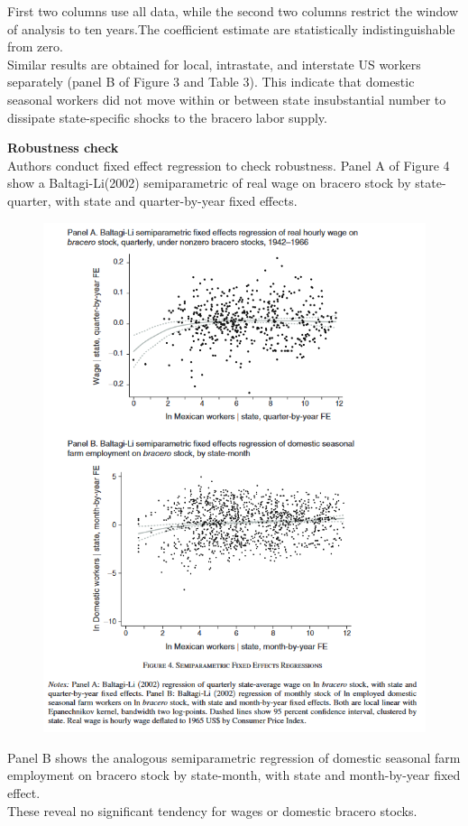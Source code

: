 \documentclass[../root]{subfiles}
\begin{document}
    First two columns use all data, while the second two columns restrict the window of analysis to ten years.The coefficient estimate are statistically indistinguishable from zero.  \\
    Similar results are obtained for local, intrastate, and interstate US workers separately (panel B of Figure 3 and Table 3). This indicate that domestic seasonal workers did not move within or between state insubstantial number to dissipate state-specific shocks to the bracero labor supply. 
    
    {\bf Robustness check} \\
    Authors conduct fixed effect regression to check robustness. Panel A of Figure 4 show a Baltagi-Li(2002) semiparametric of real wage on bracero stock by state-quarter, with state and quarter-by-year fixed effects.
    
    \begin{figure}
        \centering
        \includegraphics[width = \linewidth]{0731sugiyama/Figure4.png}
        \label{fig:my_label}
    \end{figure}
    Panel B shows the analogous semiparametric regression of domestic seasonal farm employment on bracero stock by state-month, with state and month-by-year fixed effect. \\
    These reveal no significant tendency for wages or domestic bracero stocks.
    
\end{document}
